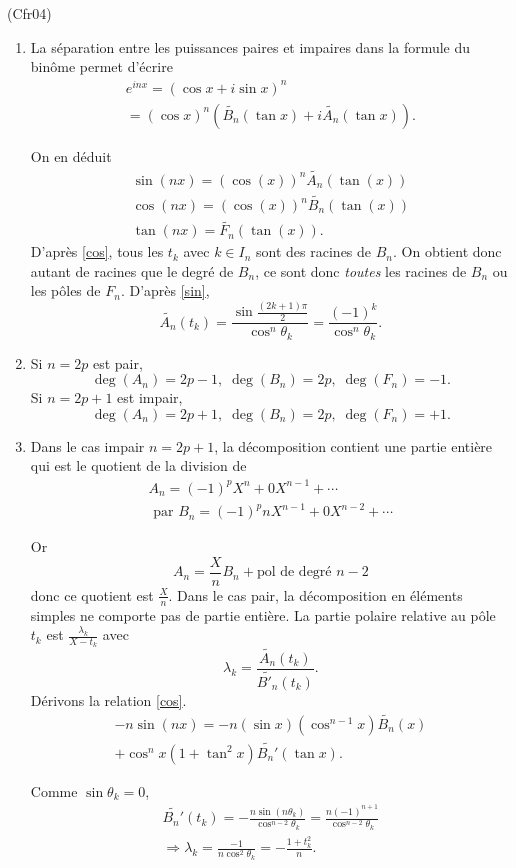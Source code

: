 \begin{tiny}(Cfr04)\end{tiny} 
\begin{enumerate}
 \item La séparation entre les puissances paires et impaires dans la formule du binôme permet d'écrire
\begin{multline*}
 e^{i n x} = \left( \cos x + i \sin x \right)^n \\
 = (\cos x )^n \left( \widetilde{B_n}(\tan x) + i\widetilde{A_n}(\tan x)  \right). 
\end{multline*}

On en déduit
\begin{align}
  \sin(nx) = (\cos(x))^n\widetilde{A_n}(\tan(x)) \label{sin} \\
  \cos(nx) = (\cos(x))^n\widetilde{B_n}(\tan(x)) \label{cos} \\
  \tan(nx) = \widetilde{F_n}(\tan(x)) \label{tan}.
\end{align}
D'après \ref{cos}, tous les $t_k$ avec $k\in I_n$ sont des racines de $B_n$. On obtient donc autant de racines que le degré de $B_n$, ce sont donc \emph{toutes} les racines de $B_n$ ou les pôles de $F_n$. D'après \ref{sin},
\[
\widetilde{A_n}(t_k) = \frac{\sin\frac{(2k+1)\pi}{2}}{\cos^n\theta_k}
= \frac{(-1)^k}{\cos^n\theta_k}.
\]

 \item Si $n=2p$ est pair, 
\[
\deg(A_n) = 2p-1, \; \deg(B_n) = 2p, \; \deg(F_n) = -1.  
\] 
Si $n=2p+1$ est impair, 
\[
\deg(A_n) = 2p+1, \; \deg(B_n) = 2p, \; \deg(F_n) = +1.  
\] 
 \item Dans le cas impair $n=2p+1$, la décomposition contient une partie entière qui est le quotient de la division de 
\begin{multline*}
A_n = (-1)^pX^n + 0X^{n-1} + \cdots \\
\text{ par }
B_n = (-1)^pnX^{n-1} + 0X^{n-2} + \cdots 
\end{multline*}

Or 
\[
 A_n = \frac{X}{n}B_n + \text{pol de degré $n-2$}
\]
donc ce quotient est $\frac{X}{n}$.\newline
Dans le cas pair, la décomposition en éléments simples ne comporte pas de partie entière.\newline
La partie polaire relative au pôle $t_k$ est $\frac{\lambda_k}{X-t_k}$ avec
\[
 \lambda_k = 
\frac{\widetilde{A_n}(t_k)}{\widetilde{B'_n}(t_k)}.
\]
Dérivons la relation \ref{cos}.
\begin{multline*}
 -n \sin(nx) = -n(\sin x)(\cos^{n-1}x) \widetilde{B_n}(x) \\
 + \cos^nx(1+\tan^2x)\widetilde{B_n'}(\tan x).
\end{multline*}

Comme $\sin \theta_k = 0$,
\begin{multline*}
\widetilde{B_n'}(t_k) = -\frac{n\sin(n\theta_k)}{\cos^{n-2}\theta_k}
= \frac{n(-1)^{n+1}}{\cos^{n-2}\theta_k}\\
\Rightarrow
\lambda_k = \frac{-1}{n\cos^2 \theta_k}
= - \frac{1+t_k^2}{n}.
\end{multline*}

\end{enumerate}
